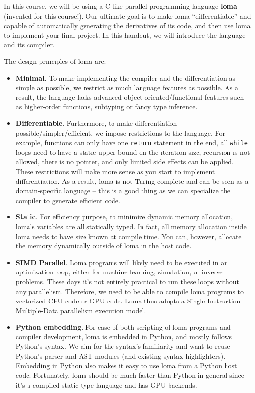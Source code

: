 





In this course, we will be using a C-like parallel programming language \textbf{loma} (invented for this course!). Our ultimate goal is to make loma ``differentiable'' and capable of automatically generating the derivatives of its code, and then use loma to implement your final project. In this handout, we will introduce the language and its compiler.

The design principles of loma are:
\begin{itemize}
    \item \textbf{Minimal}. To make implementing the compiler and the differentiation as simple as possible, we restrict as much language features as possible. As a result, the language lacks advanced object-oriented/functional features such as higher-order functions, subtyping or fancy type inference.
    \item \textbf{Differentiable}. Furthermore, to make differentiation possible/simpler/efficient, we impose restrictions to the language. For example, functions can only have one \lstinline{return} statement in the end, all \lstinline{while} loops need to have a static upper bound on the iteration size, recursion is not allowed, there is no pointer, and only limited side effects can be applied. These restrictions will make more sense as you start to implement differentiation. As a result, loma is not Turing complete and can be seen as a domain-specific language -- this is a good thing as we can specialize the compiler to generate efficient code.
    \item \textbf{Static}. For efficiency purpose, to minimize dynamic memory allocation, loma's variables are all statically typed. In fact, all memory allocation inside loma needs to have size known at compile time. You can, however, allocate the memory dynamically outside of loma in the host code.
    \item \textbf{SIMD Parallel}. Loma programs will likely need to be executed in an optimization loop, either for machine learning, simulation, or inverse problems. These days it's not entirely practical to run these loops without any parallelism. Therefore, we need to be able to compile loma programs to vectorized CPU code or GPU code. Loma thus adopts a \href{https://en.wikipedia.org/wiki/Single_instruction,_multiple_data}{Single-Instruction-Multiple-Data} parallelism execution model.
    \item \textbf{Python embedding}. For ease of both scripting of loma programs and compiler development, loma is embedded in Python, and mostly follows Python's syntax. We aim for the syntax's familiarity and want to reuse Python's parser and AST modules (and existing syntax highlighters). Embedding in Python also makes it easy to use loma from a Python host code. Fortunately, loma should be much faster than Python in general since it's a compiled static type language and has GPU backends.
\end{itemize}

